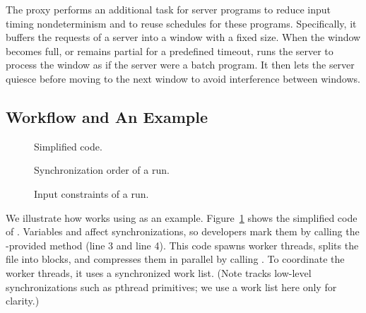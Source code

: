 The proxy performs an additional task for server programs to reduce input
timing nondeterminism and to reuse schedules for these programs.
Specifically, it buffers the requests of a server into a window with
a fixed size.
When the window becomes full, or remains partial for a predefined timeout,
\tern runs the server to process the window as if the server were a batch
program.  It then lets the server quiesce before moving to the next window to
avoid interference between windows.

\subsection{Workflow and An Example} \label{sec:tern-example}

\begin{figure}[t]
\centering
\begin{minipage}[c]{.8\linewidth}
\tiny {}
\end{minipage}
\caption{\small Simplified \pbzip code.}
\label{fig:tern-pbzip2}
\end{figure}

\begin{figure}[t]
\hspace{1.5in}
\begin{minipage}[c]{.8\linewidth}
\tiny {}
\end{minipage}
\caption{\small Synchronization order of a \pbzip run.}
\label{fig:tern-pbzip2-sync-order}
\end{figure}

\begin{figure}[t]
\centering
\begin{minipage}[c]{0.4\linewidth}
\tiny {}
\end{minipage}
\caption{\small Input constraints of a \pbzip run.}
\label{fig:tern-pbzip2-constraints}
\end{figure}

We illustrate how \tern works using \pbzip as an example.
Figure~\ref{fig:tern-pbzip2} shows the simplified code of \pbzip.  Variables
 and  affect synchronizations, so developers mark
them by calling the \tern-provided method  (line 3 and line 4). 
This
code spawns  worker threads, splits the file into 
blocks, and compresses them in parallel by calling .  To
coordinate the worker threads, it uses a synchronized work list. (Note \tern
tracks
low-level synchronizations such as pthread primitives; we use a work list
here only for clarity.)

